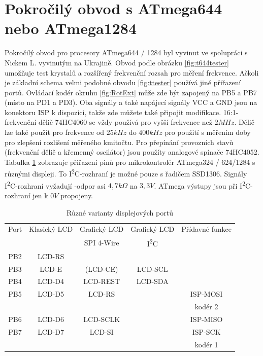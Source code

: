 \section{Pokročilý obvod s ATmega644 nebo ATmega1284}

Pokročilý obvod pro procesory ATmega644 / 1284 byl vyvinut ve spolupráci s Nickem L.
vyvinutým na Ukrajině. Obvod podle obrázku \ref{fig:t644tester} umožňuje test krystalů a rozšířený
frekvenční rozsah pro měření frekvence.
Ačkoli je základní schema velmi podobné obvodu  \ref{fig:ttester} používá jiné přiřazení portů.
Ovládací kodér okruhu \ref{fig:RotExt} může zde být zapojený na PB5 a PB7 (místo na PD1 a PD3). 
Oba signály a také napájecí signály VCC a GND jsou na konektoru ISP k dispozici,
takže zde můžete také připojit modifikace.
16:1-frekvenční dělič 74HC4060 se vždy používá pro vyšší frekvence než \(2MHz\).
Dělič lze také použít pro frekvence od \(25kHz\) do \(400kHz\) pro použití s měřením
doby pro zlepšení rozlišení měřeného kmitočtu.
Pro přepínání provozních stavů (frekvenční dělič a křemenný oscilátor) jsou
použíty analogové spínače 74HC4052.
Tabulka \ref{tab:mega644-display} zobrazuje přiřazení pinů pro mikrokontrolér
ATmega324 / 624/1284 s různými displeji.
To I\textsuperscript{2}C-rozhraní je možné pouze s řadičem SSD1306.
Signály I\textsuperscript{2}C-rozhraní vyžadují -odpor asi \(4,7k\Omega\) na \(3,3V\).
ATmega výstupy jsou při I\textsuperscript{2}C-rozhraní jen k \(0V\) propojeny.
\begin{table}[H]
  \begin{center}
    \begin{tabular}{| c || c | c | c | c |}
    \hline
      Port & Klasický LCD &  Grafický LCD & Grafický LCD  & Přídavné funkce      \\
           &               &  SPI 4-Wire  &  I\textsuperscript{2}C         &                     \\
    \hline
    \hline
    PB2    &  LCD-RS         &            &             &       \\
    \hline
    PB3    &  LCD-E          & (LCD-CE)   &  LCD-SCL    &       \\
    \hline
    PB4    &  LCD-D4         & LCD-REST   &  LCD-SDA    &       \\
    \hline
    PB5    &  LCD-D5         & LCD-RS     &             & ISP-MOSI \\
           &                 &            &             & kodér 2 \\
    \hline
    PB6    &  LCD-D6         & LCD-SCLK   &             & ISP-MISO \\
    \hline
    PB7    &  LCD-D7         & LCD-SI     &             & ISP-SCK  \\
           &                 &            &             & kodér 1 \\
    \hline
    \end{tabular}
  \end{center}
  \caption{Různé varianty displejových portů}
  \label{tab:mega644-display}
\end{table}

